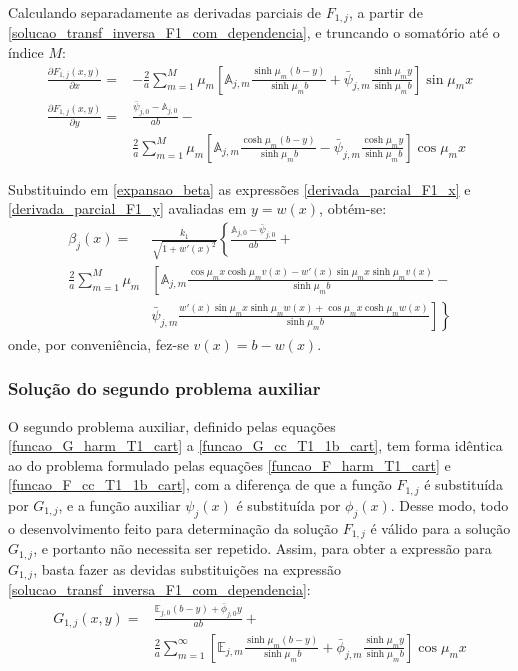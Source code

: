 Calculando separadamente as derivadas parciais de $F_{1, j}$, a partir de \eqref{solucao_transf_inversa_F1_com_dependencia}, e truncando o somatório até o índice $M$:
\begin{align}
\frac{\partial F_{1, j}(x, y)}{\partial x} = & -\frac{2}{a}\sum_{m=1}^M \mu_m \left[\mathbb{A}_{j,m}\frac{\sinh\mu_m (b - y)}{\sinh\mu_m b} + \bar{\psi}_{j, m}\frac{\sinh\mu_m y}{\sinh\mu_m b}\right]\sin\mu_m x
\label{derivada_parcial_F1_x} \\
\frac{\partial F_{1, j}(x, y)}{\partial y} = & \frac{\bar{\psi}_{j,0} - \mathbb{A}_{j,0}}{ab} - \nonumber \\
&\frac{2}{a}\sum_{m=1}^M \mu_m \left[\mathbb{A}_{j,m}\frac{\cosh\mu_m (b - y)}{\sinh\mu_m b} - \bar{\psi}_{j, m}\frac{\cosh\mu_m y}{\sinh\mu_m b}\right]\cos\mu_m x
\label{derivada_parcial_F1_y}
\end{align}

Substituindo em \eqref{expansao_beta} as expressões \eqref{derivada_parcial_F1_x} e \eqref{derivada_parcial_F1_y} avaliadas em $y = w(x)$, obtém-se:
\begin{align}
\beta_j(x) = & \frac{k_1}{\sqrt{1 + w'(x)^2}}\left\lbrace \frac{\mathbb{A}_{j,0} - \bar{\psi}_{j,0}}{ab} \right.  + \nonumber \\
\frac{2}{a}\sum_{m=1}^M \mu_m & \left[ \mathbb{A}_{j,m}\frac{\cos\mu_m x\cosh\mu_m v(x) - w'(x)\sin\mu_m x\sinh\mu_m v(x)}{\sinh\mu_m b} \right. - \nonumber \\
&\left. \left. \bar{\psi}_{j, m}\frac{w'(x)\sin\mu_m x\sinh\mu_m w(x) + \cos\mu_m x\cosh\mu_m w(x)}{\sinh\mu_m b}\right] \right\rbrace
\label{serie_para_beta}
\end{align}
onde, por conveniência, fez-se $v(x) = b - w(x)$.



\subsubsection{Solução do segundo problema auxiliar}\label{secao_reciprocidade_G}

O segundo problema auxiliar, definido pelas equações \eqref{funcao_G_harm_T1_cart} a \eqref{funcao_G_cc_T1_1b_cart}, tem forma idêntica ao do problema formulado pelas equações \eqref{funcao_F_harm_T1_cart} e \eqref{funcao_F_cc_T1_1b_cart}, com a diferença
de que a função $F_{1, j}$ é substituída por $G_{1, j}$, e a função auxiliar $\psi_j(x)$ é substituída por $\phi_j(x)$.
Desse modo, todo o desenvolvimento feito para determinação da solução $F_{1, j}$ é válido para a solução $G_{1, j}$, e portanto não necessita ser repetido. Assim, para obter a expressão para $G_{1, j}$, 
basta fazer as devidas substituições na expressão \eqref{solucao_transf_inversa_F1_com_dependencia}:
\begin{align}
G_{1, j}(x, y) = & \frac{\mathbb{E}_{j,0}(b - y) + \bar{\phi}_{j,0}y}{ab} + \nonumber \\
&\frac{2}{a}\sum_{m=1}^\infty\left[\mathbb{E}_{j,m}\frac{\sinh\mu_m (b - y)}{\sinh\mu_m b} + \bar{\phi}_{j, m}\frac{\sinh\mu_m y}{\sinh\mu_m b}\right]\cos\mu_m x
\label{solucao_transf_inversa_G1_com_dependencia}
\end{align}


